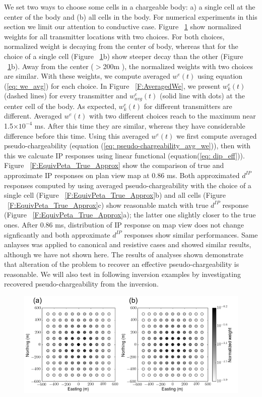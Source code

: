 \documentclass[a4paper, 11pt]{article}
\newcommand{\dip}{d^{IP}}
\begin{document}
We set two ways to choose some cells in a chargeable body: a) a single cell at the center of the body and (b) all cells in the body. 
For numerical experiments in this section we limit our attention to conductive case. 
Figure ~\ref{F:NormalizedWeights} show normalized weights for all transmitter locations with two choices.
For both choices, normalized weight is decaying from the center of body, whereas that for the choice of a single cell (Figure ~\ref{F:NormalizedWeights}b) show steeper decay than the other (Figure ~\ref{F:NormalizedWeights}b). 
Away from the center ($>$200m ), the normalized weights with two choices are similar. 
With these weights, we compute averaged $w^e(t)$ using equation (\ref{eq: we_avg}) for each choice. 
In Figure ~\ref{F:AveragedWe}, we present $w^e_k(t)$ (dashed lines) for every transmitter and $w^e_{avg}(t)$ (solid line with dots) at the center cell of the body. 
As expected, $w^e_k(t)$ for different transmitters are different. 
Averaged $w^e(t)$ with two different choices reach to the maximum near 1.5$\times 10^{-4}$ ms. 
After this time they are similar, whereas they have considerable difference before this time. 
Using this averaged $w^e(t)$ we first compute averaged pseudo-chargeability (equation (\ref{eq: pseudo-chargeability_avg_we})), then with this we calcuate IP responses using linear functional (equation(\ref{eq: dip_eff})). 
Figure ~\ref{F:EquivPeta_True_Approx} show the comparison of true and approximate IP responses on plan view map at 0.86 ms. 
Both approximated $\dip$ responses computed by using averaged pseudo-chargeability with the choice of a single cell (Figure ~\ref{F:EquivPeta_True_Approx}b) and all cells (Figure ~\ref{F:EquivPeta_True_Approx}c) show reasonable match with true $\dip$ response (Figure ~\ref{F:EquivPeta_True_Approx}a); the latter one slightly closer to the true ones. 
After 0.86 ms, distribution of IP response on map view does not change signficantly and both approximate $\dip$ responses show similar performances.
Same anlayses was applied to canonical and resistive cases and showed similar results, although we have not shown here. 
The results of analyses shown demonstrate that alteration of the problem to recover an effective pseudo-chargeability is reasonable. 
We will also test in following inversion examples by investigating recovered pseudo-chargeability from the inversion. 
\begin{figure}[htb]
  \centering
  \includegraphics[width=1.\textwidth]{figures/NormalizedWeights.png}
  \caption{}
  \label{F:NormalizedWeights}
\end{figure}
\end{document}

